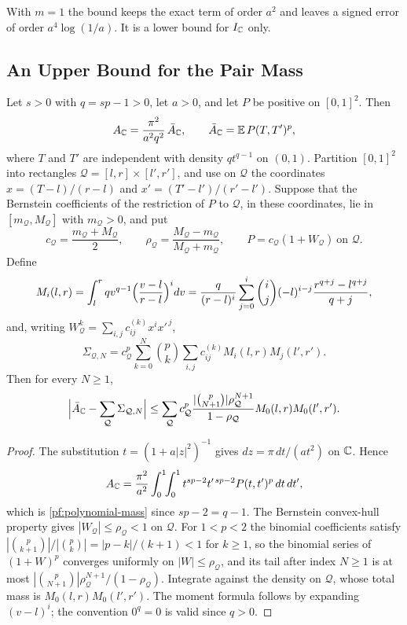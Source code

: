 With $m=1$ the bound keeps the exact term of order $a^2$ and leaves a
signed error of order $a^4\log(1/a)$. It is a lower bound for $I_\mathbb C$
only.

\subsection{An Upper Bound for the Pair Mass}

\begin{proposition}\label{pf:mass}
Let $s>0$ with $q=sp-1>0$, let $a>0$, and let $P$ be positive on
$[0,1]^2$. Then
\begin{equation}\label{pf:polynomial-mass}
 A_\mathbb C=\frac{\pi^2}{a^2q^2}\,\bar A_\mathbb C,\qquad
 \bar A_\mathbb C=\mathbb E\,P(T,T')^p,
\end{equation}
where $T$ and $T'$ are independent with density $qt^{q-1}$ on $(0,1)$.
Partition $[0,1]^2$ into rectangles $\mathcal Q=[l,r]\times[l',r']$, and
use on $\mathcal Q$ the coordinates $x=(T-l)/(r-l)$ and
$x'=(T'-l')/(r'-l')$. Suppose that the Bernstein coefficients of the
restriction of $P$ to $\mathcal Q$, in these coordinates, lie in
$[m_{\mathcal Q},M_{\mathcal Q}]$ with $m_{\mathcal Q}>0$, and put
\[
 c_{\mathcal Q}=\frac{m_{\mathcal Q}+M_{\mathcal Q}}2,\qquad
 \rho_{\mathcal Q}=\frac{M_{\mathcal Q}-m_{\mathcal Q}}
 {M_{\mathcal Q}+m_{\mathcal Q}},\qquad
 P=c_{\mathcal Q}(1+W_{\mathcal Q})\ \text{on }\mathcal Q .
\]
Define
\begin{equation}\label{pf:subrectangle-moments}
 M_i(l,r)=\int_l^rqv^{q-1}\Bigl(\frac{v-l}{r-l}\Bigr)^idv
 =\frac q{(r-l)^i}\sum_{j=0}^i\binom ij(-l)^{i-j}
 \frac{r^{q+j}-l^{q+j}}{q+j},
\end{equation}
and, writing $W_{\mathcal Q}^k=\sum_{i,j}c^{(k)}_{ij}x^ix'^{\,j}$,
\[
 \Sigma_{\mathcal Q,N}=c_{\mathcal Q}^p\sum_{k=0}^N\binom pk
 \sum_{i,j}c^{(k)}_{ij}M_i(l,r)M_j(l',r').
\]
Then for every $N\ge1$,
\begin{equation}\label{pf:subrectangle-mass}
 \Bigl|\bar A_\mathbb C-\sum_{\mathcal Q}\Sigma_{\mathcal Q,N}\Bigr|
 \le\sum_{\mathcal Q}c_{\mathcal Q}^p
 \frac{|\binom p{N+1}|\rho_{\mathcal Q}^{N+1}}{1-\rho_{\mathcal Q}}
 M_0(l,r)M_0(l',r').
\end{equation}
\end{proposition}

\begin{proof}
The substitution $t=(1+a|z|^2)^{-1}$ gives $dz=\pi\,dt/(at^2)$ on $\mathbb C$.
Hence
\[
 A_\mathbb C=\frac{\pi^2}{a^2}\int_0^1\!\!\int_0^1t^{sp-2}t'^{\,sp-2}
 P(t,t')^p\,dt\,dt',
\]
which is \eqref{pf:polynomial-mass} since $sp-2=q-1$. The Bernstein
convex-hull property gives $|W_{\mathcal Q}|\le\rho_{\mathcal Q}<1$ on
$\mathcal Q$. For $1<p<2$ the binomial coefficients satisfy
$|\binom p{k+1}|/|\binom pk|=|p-k|/(k+1)<1$ for $k\ge1$, so the binomial
series of $(1+W)^p$ converges uniformly on $|W|\le\rho_{\mathcal Q}$,
and its tail after index $N\ge1$ is at most
$|\binom p{N+1}|\rho_{\mathcal Q}^{N+1}/(1-\rho_{\mathcal Q})$.
Integrate against the density on $\mathcal Q$, whose total mass is
$M_0(l,r)M_0(l',r')$. The moment formula follows by expanding
$(v-l)^i$; the convention $0^q=0$ is valid since $q>0$.
\end{proof}

